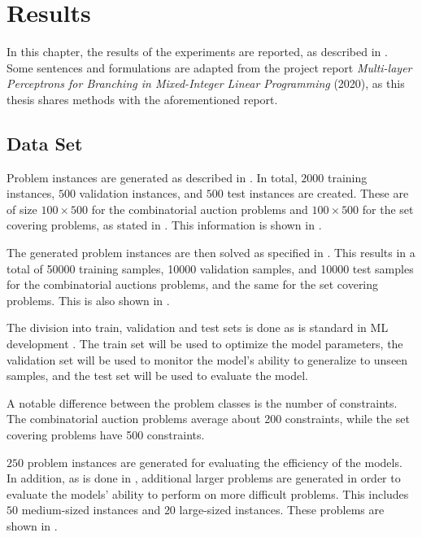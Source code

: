 \chapter{Results}\label{cha:results}

In this chapter, the results of the experiments are reported, as described in . Some sentences and formulations are adapted from the project report \textit{Multi-layer Perceptrons for Branching in Mixed-Integer Linear Programming} (2020), as this thesis shares methods with the aforementioned report. 


\section{Data Set}\label{sec:datagen}

Problem instances are generated as described in . In total, $2000$ training instances, $500$ validation instances, and $ 500 $ test instances are created. These are of size $100 \times 500$ for the combinatorial auction problems and $100 \times 500$ for the set covering problems, as stated in . This information is shown in .

The generated problem instances are then solved as specified in . This results in a total of 50000 training samples, 10000 validation samples, and 10000 test samples for the combinatorial auctions problems, and the same for the set covering problems. This is also shown in .

The division into train, validation and test sets is done as is standard in \gls{ML} development \cite{goodfellow2016deep}. The train set will be used to optimize the model parameters, the validation set will be used to monitor the model's ability to generalize to unseen samples, and the test set will be used to evaluate the model. 

A notable difference between the problem classes is the number of constraints. The combinatorial auction problems average about 200 constraints, while the set covering problems have 500 constraints.  

$250$ problem instances are generated for evaluating the efficiency of the models. In addition, as is done in \cite{gasse2019exact}, additional larger problems are generated in order to evaluate the models' ability to perform on more difficult problems. This includes $50$ medium-sized instances and $20$ large-sized instances. These problems are shown in .

